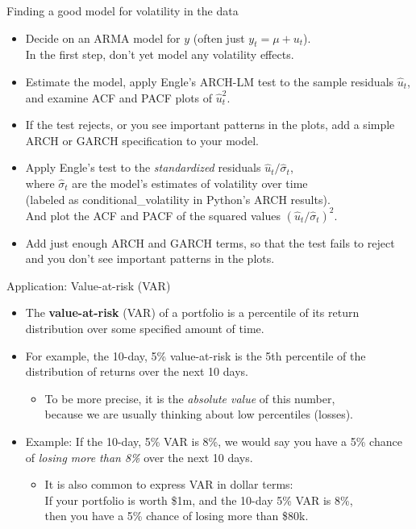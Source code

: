 \documentclass[t,12pt]{beamer}
\begin{document}
\begin{frame}[c]{Finding a good model for volatility in the data}
\begin{itemize}
\item Decide on an ARMA model for $y$ (often just $y_t = \mu + u_t$).
\\ In the first step, don't yet model any volatility effects.
\smallskip
\item Estimate the model, apply Engle's ARCH-LM test to the sample residuals $\hat{u}_t$, and examine ACF and PACF plots of $\hat{u}_t^2$.
\smallskip
\item If the test rejects, or you see important patterns in the plots, add a simple ARCH or GARCH specification to your model.
\smallskip
\item Apply Engle's test to the \emph{standardized} residuals $\hat{u}_t / \hat{\sigma}_t$, 
\\ where $\hat{\sigma}_t$ are the model's estimates of volatility over time 
\\ (labeled as conditional\_volatility in Python's ARCH results).
\\ And plot the ACF and PACF of the squared values $(\hat{u}_t / \hat{\sigma}_t)^2$.
\smallskip
\item Add just enough ARCH and GARCH terms, so that the test fails to reject and you don't see important patterns in the plots.
\end{itemize}
\end{frame}

\begin{frame}[c]{Application: Value-at-risk (VAR)}
\begin{itemize}
\item The \textbf{value-at-risk} (VAR) of a portfolio is a percentile of its return distribution over some specified amount of time.
\medskip
\item For example, the 10-day, 5\% value-at-risk is the 5th percentile of the distribution of returns over the next 10 days.
\begin{itemize}
\smallskip
\item To be more precise, it is the \emph{absolute value} of this number, 
\\ because we are usually thinking about low percentiles (losses).
\end{itemize}
\medskip
\item Example: If the 10-day, 5\% VAR is 8\%, we would say you have a 5\% chance of \emph{losing more than 8\%} over the next 10 days.
\begin{itemize}
\smallskip
\item It is also common to express VAR in dollar terms: 
\\ If your portfolio is worth \$1m, and the 10-day 5\% VAR is 8\%, 
\\ then you have a 5\% chance of losing more than \$80k.
\end{itemize}
\end{itemize}
\end{frame}
\end{document}
